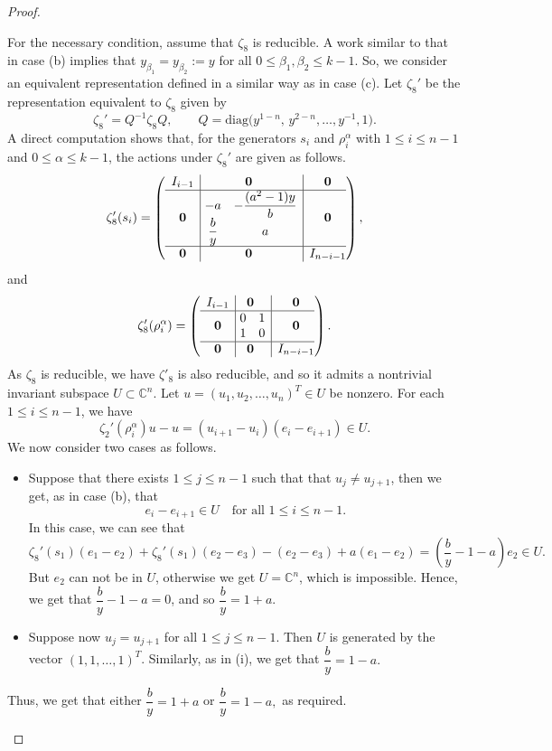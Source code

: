 \documentclass[10pt,a4paper]{amsart}
\begin{document}
\begin{proof}
\begin{itemize}
For the necessary condition, assume that $\zeta_8$ is reducible. A work similar to that in case (b) implies that $y_{\beta_1} = y_{\beta_2} := y$ for all $0 \le \beta_1, \beta_2 \le k-1$. So, we consider an equivalent representation defined in a similar way as in case (c). Let $\zeta_8'$ be the representation equivalent to $\zeta_8$ given by
\[
\zeta_8'=Q^{-1}\zeta_8Q,
\qquad
Q=\mathrm{diag}\big(y^{1-n},\,y^{2-n},\ldots,y^{-1},1\big).
\]
A direct computation shows that, for the generators $s_i$ and $\rho_i^\alpha$
with $1 \le i \le n-1$ and $0 \le \alpha \le k-1$, the actions under $\zeta_8'$ are given as follows.
\[
\zeta_8'(s_i)=
\left(
\begin{array}{c|@{}c|c@{}}
\begin{matrix} I_{i-1} \end{matrix} & \mathbf{0} & \mathbf{0} \\
\hline
\mathbf{0} &
\begin{matrix}
\ -a & - \dfrac{(a^2-1)y}{b}\\
\ \dfrac{b}{y} & a
\end{matrix}
& \mathbf{0} \\
\hline
\mathbf{0} & \mathbf{0} & I_{n-i-1}
\end{array}
\right),
\]
and
\[
\zeta_8'(\rho_i^{\alpha})=
\left(
\begin{array}{c|@{}c|c@{}}
\begin{matrix} I_{i-1} \end{matrix} & \mathbf{0} & \mathbf{0} \\
\hline
\mathbf{0} &
\begin{matrix}
\ 0 & 1\\
\ 1 & 0
\end{matrix}
& \mathbf{0} \\
\hline
\mathbf{0} & \mathbf{0} & I_{n-i-1}
\end{array}
\right).
\]
As $\zeta_8$ is reducible, we have $\zeta'_8$ is also reducible, and so it admits a nontrivial invariant subspace
$U \subset \mathbb{C}^n$. Let $u=(u_1,u_2,\ldots,u_n)^T \in U$ be nonzero. For each $1 \le i \le n-1$, we have
\[
\zeta_2'(\rho_i^{\alpha})u - u
= (u_{i+1}-u_i)(e_i-e_{i+1}) \in U.
\]
We now consider two cases as follows.
\begin{itemize}
    \item[(i)] Suppose that there exists $1 \le j \le n-1$ such that that $u_j\neq u_{j+1}$, then we get, as in case (b), that
\[
e_i-e_{i+1} \in U \quad \text{for all } 1 \le i \le n-1.
\]
In this case, we can see that 
$$\zeta_8'(s_1)(e_1-e_2)+\zeta_8'(s_1)(e_2-e_3)-(e_2-e_3)+a(e_1-e_2)=\left( \dfrac{b}{y}-1-a \right)e_2\in U.$$
But $e_2$ can not be in $U$, otherwise we get $U=\mathbb{C}^n$, which is impossible. Hence, we get that $ \dfrac{b}{y}-1-a=0$, and so $ \dfrac{b}{y}=1+a$.
\item[(ii)] Suppose now $u_j= u_{j+1}$ for all $1\leq j\leq n-1$. Then $U$ is generated by the vector $(1,1,\ldots ,1)^T$. Similarly, as in (i), we get that $\dfrac{b}{y}=1-a.$
\end{itemize}
Thus, we get that either $ \dfrac{b}{y}=1+a$ or $\dfrac{b}{y}=1-a,$ as required.


\end{itemize}
\end{proof}
\end{document}
